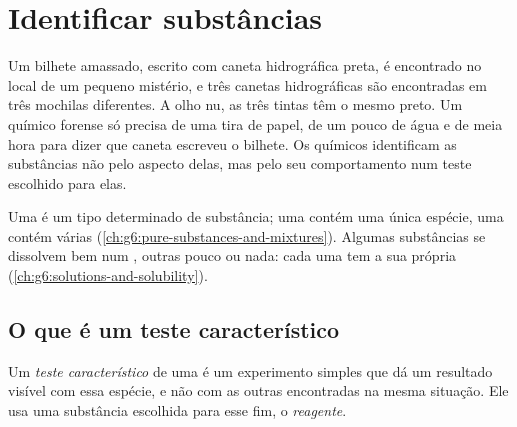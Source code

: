 \chapter{Identificar substâncias}\label{ch:g7:identifying-substances}

Um bilhete amassado, escrito com caneta hidrográfica preta, é encontrado
no local de um pequeno mistério, e três canetas hidrográficas são
encontradas em três mochilas diferentes. A olho nu, as três tintas têm o
mesmo preto. Um químico forense só precisa de uma tira de papel, de um
pouco de água e de meia hora para dizer que caneta escreveu o bilhete.
Os químicos identificam as substâncias não pelo aspecto delas, mas pelo
seu comportamento num teste escolhido para elas.

\begin{recall}
Uma  é um tipo determinado de substância; uma  contém uma única espécie, uma  contém várias
(\cref{ch:g6:pure-substances-and-mixtures}). Algumas substâncias se
dissolvem bem num , outras pouco ou nada: cada uma tem a sua
própria  (\cref{ch:g6:solutions-and-solubility}).
\end{recall}

\section{O que é um teste característico}

\begin{definition}\label{def:g7:identifying-substances:characteristic-test}
Um \emph{teste característico} de uma
 é um experimento simples que dá um resultado visível com
essa espécie, e não com as outras encontradas na mesma situação. Ele usa
uma substância escolhida para esse fim, o
\emph{reagente}.
\end{definition}


